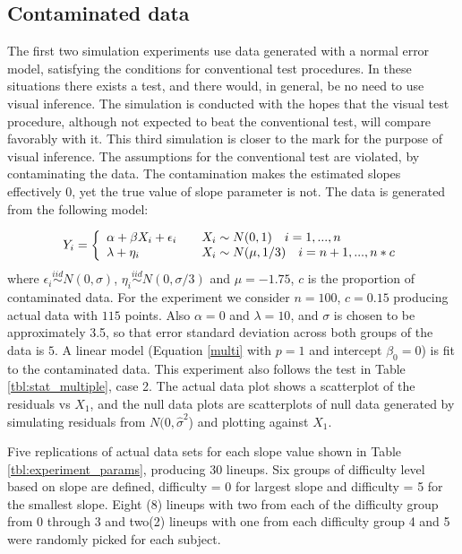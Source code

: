 \documentclass{article}
\begin{document}
\subsection{Contaminated data}

The first two simulation experiments use data generated with a normal error model, satisfying the conditions for conventional test procedures. In these situations there exists a test, and there would, in general, be no need to use visual inference. The simulation is conducted with the hopes that the visual test procedure, although not expected to beat the conventional test, will compare favorably with it. This third simulation is closer to the mark for the purpose of visual inference. The assumptions for the conventional test are violated, by contaminating the data. The contamination makes the estimated slopes effectively 0, yet the true value of slope parameter is not.  The data is generated from the following model:

\[
  Y_i = \left\{
  \begin{array}{l l}
    \alpha+\beta X_i + \epsilon_i  & \quad  X_i \sim N(0,1) \quad  i =1,...,n\\
    \lambda+ \eta_i & \quad X_i \sim N(\mu,1/3) \quad  i=n+1, ...,n*c\\
  \end{array} \right.
\]
where $\epsilon_i \stackrel{iid}\sim N(0,\sigma)$, $\eta_i \stackrel{iid}\sim N(0,\sigma/3)$ and $\mu = -1.75$, $c$ is the proportion of contaminated data. For the experiment we consider $n=100$, $c=0.15$ producing actual data with $115$ points. Also $\alpha=0$ and $\lambda=10$, and $\sigma$ is chosen to be approximately 3.5, so that error standard deviation across both groups of the data is $5$. %
A linear model (Equation \ref{multi} with $p=1$  and intercept $\beta_0=0$) is fit to the contaminated data. This experiment also follows the test in Table \ref{tbl:stat_multiple}, case 2. The actual data plot shows a scatterplot of the residuals vs $X_1$, and the null data plots are scatterplots of null data generated by simulating residuals from $N(0, {\hat{\sigma}}^2$) and plotting against $X_1$. 

Five replications of actual data sets for each slope value shown in Table \ref{tbl:experiment_params}, producing 30 lineups. Six groups of difficulty level based on slope are defined, difficulty = 0 for largest slope and difficulty = 5 for the smallest slope.    Eight (8) lineups with two from each of the difficulty group from 0 through 3 and two(2) lineups with one from each difficulty group 4 and 5 were randomly picked for each subject. 
\end{document}
